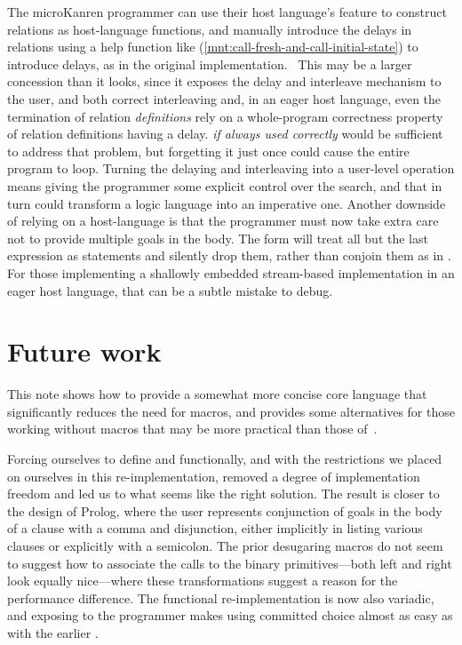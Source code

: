 \documentclass[sigplan,balance=true,pbalance=true,natbib=false]{acmart}
\begin{document}
The microKanren programmer can use their host language's
 feature to construct relations as host-language
functions, and manually introduce the delays in relations using a help
function like 
(\cref{mnt:call-fresh-and-call-initial-state}) to introduce delays, as
in the original implementation.~\cite{hemann2013muKanren} This may be
a larger concession than it looks, since it exposes the delay and
interleave mechanism to the user, and both correct interleaving and,
in an eager host language, even the termination of relation
\emph{definitions} rely on a whole-program correctness property of
relation definitions having a delay.  \emph{if always
  used correctly} would be sufficient to address that problem, but
forgetting it just once could cause the entire program to loop.
Turning the delaying and interleaving into a user-level operation
means giving the programmer some explicit control over the search, and
that in turn could transform a logic language into an imperative one.
Another downside of relying on a host-language  is
that the programmer must now take extra care not to provide multiple
goals in the body. The  form will treat all but the
last expression as statements and silently drop them, rather than
conjoin them as in . For those implementing a
shallowly embedded stream-based implementation in an eager host
language, that can be a subtle mistake to debug.

\section{Future work}\label{sec:conclusion}

This note shows how to provide a somewhat more concise core language
that significantly reduces the need for macros, and provides some
alternatives for those working without macros that may be more practical
than those of~\citet{hemann2013muKanren}.

Forcing ourselves to define  and 
functionally, and with the restrictions we placed on ourselves in this
re-implementation, removed a degree of implementation freedom and led
us to what seems like the right solution. The result is closer to the
design of Prolog, where the user represents conjunction of goals in
the body of a clause with a comma and disjunction, either implicitly
in listing various clauses or explicitly with a semicolon. The prior
desugaring macros do not seem to suggest how to associate the calls to
the binary primitives---both left and right look equally nice---where
these transformations suggest a reason for the performance difference.
The functional  re-implementation is now also
variadic, and exposing  to the programmer makes using
committed choice almost as easy as with the
earlier .
\end{document}
